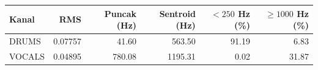 \begin{tabular}{lrrrrr}
\toprule
Kanal & RMS & Puncak (Hz) & Sentroid (Hz) & $<250$ Hz (\%) & $\geq1000$ Hz (\%) \\
\midrule
DRUMS & 0.07757 & 41.60 & 563.50 & 91.19 & 6.83 \\
VOCALS & 0.04895 & 780.08 & 1195.31 & 0.02 & 31.87 \\
\bottomrule
\end{tabular}
